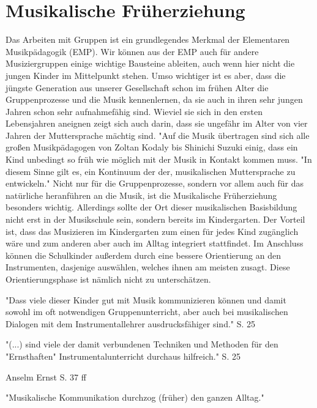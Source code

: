 \section{Musikalische Früherziehung}

Das Arbeiten mit Gruppen ist ein grundlegendes Merkmal der Elementaren
Musikpädagogik (EMP). Wir können aus der EMP auch für andere Musiziergruppen einige
wichtige Bausteine ableiten, auch wenn hier nicht die jungen Kinder im
Mittelpunkt stehen. Umso wichtiger ist es aber, dass die jüngste Generation aus
unserer Gesellschaft schon im frühen Alter die Gruppenprozesse und die Musik kennenlernen, da
sie auch in ihren sehr jungen Jahren schon sehr aufnahmefähig sind. Wieviel sie
sich in den ersten Lebensjahren aneignen zeigt sich auch darin, dass sie
ungefähr im Alter von vier Jahren der Muttersprache mächtig sind. "Auf die Musik übertragen sind sich alle großen
Musikpädagogen von Zoltan Kodaly bis Shinichi Suzuki einig, dass ein Kind
unbedingt so früh wie möglich mit der Musik in Kontakt kommen muss. "In diesem
Sinne gilt es, ein Kontinuum der der, musikalischen Muttersprache zu
entwickeln." \autocite[45]{ernst:die_zukunftsfaehige_musikschule} Nicht nur
für die Gruppenprozesse, sondern vor allem auch für das natürliche heranführen an
die Musik, ist die Musikalische Früherziehung besonders wichtig.
Allerdings sollte der Ort dieser musikalischen Basisbildung nicht erst in der
Musikschule sein, sondern bereits im Kindergarten. \autocite[43]{ernst:die_zukunftsfaehige_musikschule}Der Vorteil ist, dass das
Musizieren im
Kindergarten zum einen für jedes Kind zugänglich wäre und zum anderen aber auch
im Alltag integriert stattfindet. Im Anschluss können die Schulkinder außerdem
durch eine bessere Orientierung an den Instrumenten, dasjenige auswählen,
welches ihnen am meisten zusagt. Diese Orientierungsphase ist nämlich nicht zu
unterschätzen. 





"Dass viele dieser Kinder gut mit Musik kommunizieren können und damit sowohl im
oft notwendigen Gruppenunterricht, aber auch bei musikalischen Dialogen mit dem
Instrumentallehrer ausdrucksfähiger sind." S. 25

"(...) sind viele der damit verbundenen Techniken und Methoden für den
"Ernsthaften" Instrumentalunterricht durchaus hilfreich." S. 25

Anselm Ernst S. 37 ff

"Musikalische Kommunikation durchzog (früher) den ganzen Alltag."
\autocite[37]{ernst:die_zukunftsfaehige_musikschule}

